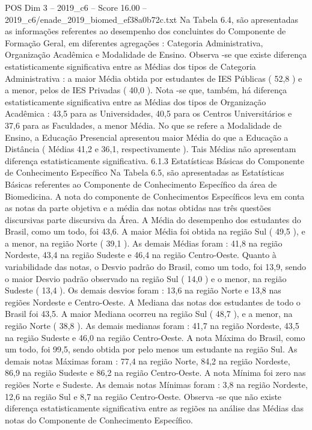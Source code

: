 \begin{textsample}{POS Dim 3 – 2019\_c6 – Score 16.00 – 2019\_c6/enade\_2019\_biomed\_ef38a0b72c.txt}
Na Tabela 6.4, são apresentadas as informações referentes ao desempenho dos concluintes do Componente de Formação Geral, em diferentes agregações : Categoria Administrativa, Organização Acadêmica e Modalidade de Ensino.
Observa -se que existe diferença estatisticamente significativa entre as Médias dos tipos de Categoria Administrativa : a maior Média obtida por estudantes de IES Públicas ( 52,8 ) e a menor, pelos de IES Privadas ( 40,0 ).
Nota -se que, também, há diferença estatisticamente significativa entre as Médias dos tipos de Organização Acadêmica : 43,5 para as Universidades, 40,5 para os Centros Universitários e 37,6 para as Faculdades, a menor Média.
No que se refere a Modalidade de Ensino, a Educação Presencial apresentou maior Média do que a Educação a Distância ( Médias 41,2 e 36,1, respectivamente ).
Tais Médias não apresentam diferença estatisticamente significativa. 6.1.3 Estatísticas Básicas do Componente de Conhecimento Específico Na Tabela 6.5, são apresentadas as Estatísticas Básicas referentes ao Componente de Conhecimento Específico da área de Biomedicina.
A nota do componente de Conhecimentos Específicos leva em conta as notas da parte objetiva e a média das notas obtidas nas três questões discursivas parte discursiva da Área.
A Média do desempenho dos estudantes do Brasil, como um todo, foi 43,6.
A maior Média foi obtida na região Sul ( 49,5 ), e a menor, na região Norte ( 39,1 ).
As demais Médias foram : 41,8 na região Nordeste, 43,4 na região Sudeste e 46,4 na região Centro-Oeste.
Quanto à variabilidade das notas, o Desvio padrão do Brasil, como um todo, foi 13,9, sendo o maior Desvio padrão observado na região Sul ( 14,0 ) e o menor, na região Sudeste ( 13,4 ).
Os demais desvios foram : 13,6 na região Norte e 13,8 nas regiões Nordeste e Centro-Oeste.
A Mediana das notas dos estudantes de todo o Brasil foi 43,5.
A maior Mediana ocorreu na região Sul ( 48,7 ), e a menor, na região Norte ( 38,8 ).
As demais medianas foram : 41,7 na região Nordeste, 43,5 na região Sudeste e 46,0 na região Centro-Oeste.
A nota Máxima do Brasil, como um todo, foi 99,5, sendo obtida por pelo menos um estudante na região Sul.
As demais notas Máximas foram : 77,4 na região Norte, 84,2 na região Nordeste, 86,9 na região Sudeste e 86,2 na região Centro-Oeste.
A nota Mínima foi zero nas regiões Norte e Sudeste.
As demais notas Mínimas foram : 3,8 na região Nordeste, 12,6 na região Sul e 8,7 na região Centro-Oeste.
Observa -se que não existe diferença estatisticamente significativa entre as regiões na análise das Médias das notas do Componente de Conhecimento Específico.

\end{textsample}
